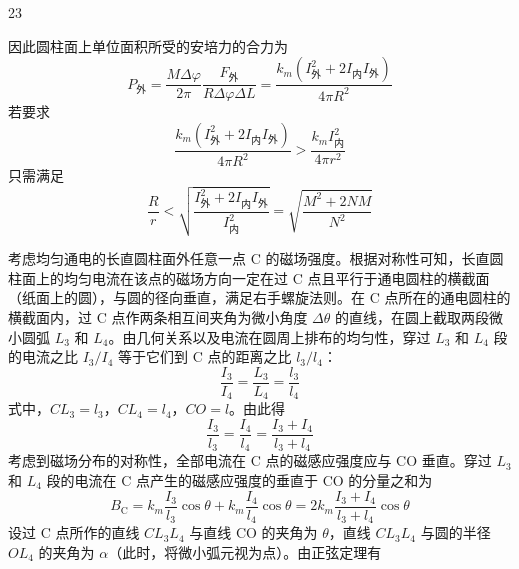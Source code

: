 \begin{solution}{23}
\begin{subsolution}
        因此圆柱面上单位面积所受的安培力的合力为
        \begin{equation}
            P_{\text{外}} = \frac{M\Delta\varphi}{2\pi}\frac{F_{\text{外}}}{R\Delta\varphi \Delta L} = \frac{k_m(I_{\text{外}}^2 + 2I_{\text{内}}I_{\text{外}})}{4\pi R^2}
            \label{eq:16.s23}
        \end{equation}
        若要求
        \begin{equation}
            \frac{k_m(I_{\text{外}}^2 + 2I_{\text{内}}I_{\text{外}})}{4\pi R^2} > \frac{k_m I_{\text{内}}^2}{4\pi r^2}
            \label{eq:17.s23}
        \end{equation}
        只需满足
        \begin{equation}
            \frac{R}{r} < \sqrt{\frac{I_{\text{外}}^2 + 2I_{\text{内}}I_{\text{外}}}{I_{\text{内}}^2}} = \sqrt{\frac{M^2 + 2NM}{N^2}}
            \label{eq:18.s23}
        \end{equation}
    \end{subsolution}
    \begin{subsolution}
        考虑均匀通电的长直圆柱面外任意一点 C 的磁场强度。根据对称性可知，长直圆柱面上的均匀电流在该点的磁场方向一定在过 C 点且平行于通电圆柱的横截面（纸面上的圆），与圆的径向垂直，满足右手螺旋法则。在 C 点所在的通电圆柱的横截面内，过 C 点作两条相互间夹角为微小角度 $\Delta\theta$ 的直线，在圆上截取两段微小圆弧 $L_3$ 和 $L_4$。由几何关系以及电流在圆周上排布的均匀性，穿过 $L_3$ 和 $L_4$ 段的电流之比 $I_3/I_4$ 等于它们到 C 点的距离之比 $l_3/l_4$：
        \begin{equation}
            \frac{I_3}{I_4} = \frac{L_3}{L_4} = \frac{l_3}{l_4}
            \label{eq:19.s23}
        \end{equation}
        式中，$CL_3 = l_3$，$CL_4 = l_4$，$CO = l$。由此得
        \begin{equation}
            \frac{I_3}{l_3} = \frac{I_4}{l_4} = \frac{I_3 + I_4}{l_3 + l_4}
            \label{eq:20.s23}
        \end{equation}
        考虑到磁场分布的对称性，全部电流在 C 点的磁感应强度应与 CO 垂直。穿过 $L_3$ 和 $L_4$ 段的电流在 C 点产生的磁感应强度的垂直于 CO 的分量之和为
        \begin{equation}
            B_{\mathrm{C}} = k_m\frac{I_3}{l_3}\cos\theta + k_m\frac{I_4}{l_4}\cos\theta = 2k_m\frac{I_3 + I_4}{l_3 + l_4}\cos\theta
            \label{eq:21.s23}
        \end{equation}
        设过 C 点所作的直线 $CL_3 L_4$ 与直线 CO 的夹角为 $\theta$，直线 $CL_3 L_4$ 与圆的半径 $OL_4$ 的夹角为 $\alpha$（此时，将微小弧元视为点）。由正弦定理有

\end{subsolution}
\end{solution}
